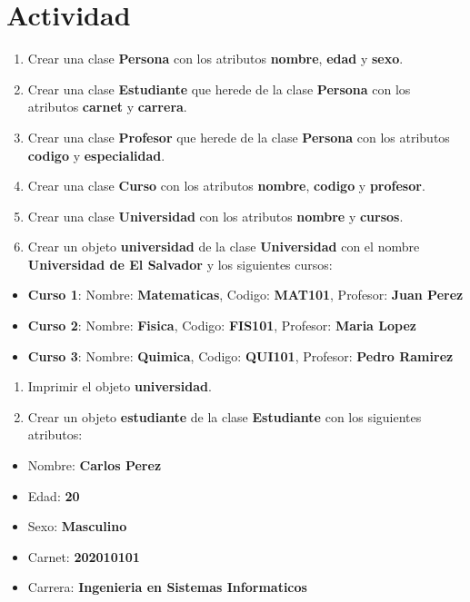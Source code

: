 \documentclass[
  a4paper,
  DIV=11,
  numbers=noendperiod,
  onepage,
  openany]{scrreprt}
\providecommand{\tightlist}{%
  \setlength{\itemsep}{0pt}\setlength{\parskip}{0pt}}\usepackage{longtable,booktabs,array}
\begin{document}
\section{Actividad}\label{actividad-4}

\begin{enumerate}
\def\labelenumi{\arabic{enumi}.}
\item
  Crear una clase \textbf{Persona} con los atributos \textbf{nombre},
  \textbf{edad} y \textbf{sexo}.
\item
  Crear una clase \textbf{Estudiante} que herede de la clase
  \textbf{Persona} con los atributos \textbf{carnet} y \textbf{carrera}.
\item
  Crear una clase \textbf{Profesor} que herede de la clase
  \textbf{Persona} con los atributos \textbf{codigo} y
  \textbf{especialidad}.
\item
  Crear una clase \textbf{Curso} con los atributos \textbf{nombre},
  \textbf{codigo} y \textbf{profesor}.
\item
  Crear una clase \textbf{Universidad} con los atributos \textbf{nombre}
  y \textbf{cursos}.
\item
  Crear un objeto \textbf{universidad} de la clase \textbf{Universidad}
  con el nombre \textbf{Universidad de El Salvador} y los siguientes
  cursos:
\end{enumerate}

\begin{itemize}
\tightlist
\item
  \textbf{Curso 1}: Nombre: \textbf{Matematicas}, Codigo:
  \textbf{MAT101}, Profesor: \textbf{Juan Perez}
\item
  \textbf{Curso 2}: Nombre: \textbf{Fisica}, Codigo: \textbf{FIS101},
  Profesor: \textbf{Maria Lopez}
\item
  \textbf{Curso 3}: Nombre: \textbf{Quimica}, Codigo: \textbf{QUI101},
  Profesor: \textbf{Pedro Ramirez}
\end{itemize}

\begin{enumerate}
\def\labelenumi{\arabic{enumi}.}
\setcounter{enumi}{6}
\item
  Imprimir el objeto \textbf{universidad}.
\item
  Crear un objeto \textbf{estudiante} de la clase \textbf{Estudiante}
  con los siguientes atributos:
\end{enumerate}

\begin{itemize}
\item
  Nombre: \textbf{Carlos Perez}
\item
  Edad: \textbf{20}
\item
  Sexo: \textbf{Masculino}
\item
  Carnet: \textbf{202010101}
\item
  Carrera: \textbf{Ingenieria en Sistemas Informaticos}
\end{itemize}
\end{document}
